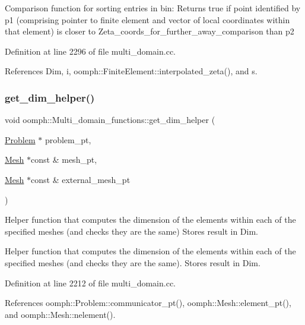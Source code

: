 Comparison function for sorting entries in bin\+: Returns true if point identified by p1 (comprising pointer to finite element and vector of local coordinates within that element) is closer to Zeta\+\_\+coords\+\_\+for\+\_\+further\+\_\+away\+\_\+comparison than p2 

Definition at line 2296 of file multi\+\_\+domain.\+cc.



References Dim, i, oomph\+::\+Finite\+Element\+::interpolated\+\_\+zeta(), and s.

\mbox{\label{namespaceoomph_1_1Multi__domain__functions_a81f7a581bfb6abfcce009546b80b9898}} 
\subsubsection{\texorpdfstring{get\+\_\+dim\+\_\+helper()}{get\_dim\_helper()}}
{\footnotesize\ttfamily void oomph\+::\+Multi\+\_\+domain\+\_\+functions\+::get\+\_\+dim\+\_\+helper (\begin{DoxyParamCaption}\item[{\hyperlink{classoomph_1_1Problem}{Problem} $\ast$}]{problem\+\_\+pt,  }\item[{\hyperlink{classoomph_1_1Mesh}{Mesh} $\ast$const \&}]{mesh\+\_\+pt,  }\item[{\hyperlink{classoomph_1_1Mesh}{Mesh} $\ast$const \&}]{external\+\_\+mesh\+\_\+pt }\end{DoxyParamCaption})}



Helper function that computes the dimension of the elements within each of the specified meshes (and checks they are the same) Stores result in Dim. 

Helper function that computes the dimension of the elements within each of the specified meshes (and checks they are the same). Stores result in Dim. 

Definition at line 2212 of file multi\+\_\+domain.\+cc.



References oomph\+::\+Problem\+::communicator\+\_\+pt(), oomph\+::\+Mesh\+::element\+\_\+pt(), and oomph\+::\+Mesh\+::nelement().



